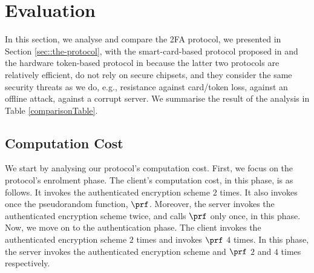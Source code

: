 
\vspace{-2mm}
\section{Evaluation}\label{sec::eval}

In this section, we analyse and compare the 2FA protocol, we presented in Section \ref{sec::the-protocol}, with the smart-card-based protocol proposed in  \cite{WangW18} and the hardware token-based protocol in \cite{JareckiJKSS21} because the latter two protocols are relatively efficient, do not rely on secure chipsets, and they consider the same security threats as we do, e.g., resistance against card/token loss, against an offline attack, against a  corrupt server. We summarise the result of the analysis in Table \ref{comparisonTable}. 











\subsection{Computation Cost}

We start by analysing our protocol's computation cost. First, we focus on the protocol's enrolment phase. The client's computation cost, in this phase, is as follows. It invokes the authenticated encryption scheme $2$ times. It also invokes once the pseudorandom function, $\prf$.
%
% 
  Moreover, the server invokes the authenticated encryption scheme twice, and calls $\prf$ only once, in this phase. 
%  
%
Now, we move on to the authentication phase. The client invokes the authenticated encryption scheme $2$ times and invokes $\prf$ $4$ times. 
%
%
 In this phase, the server invokes the authenticated encryption scheme and $\prf$ $2$ and $4$ times respectively. %

